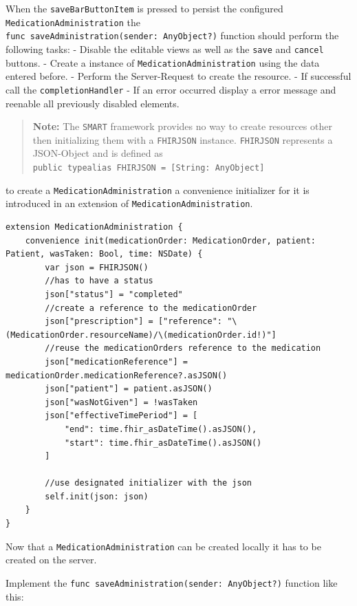 \documentclass{article}
\begin{document}
When the \texttt{saveBarButtonItem} is pressed to persist the configured
\texttt{MedicationAdministration} the
\texttt{func\ saveAdministration(sender:\ AnyObject?)} function should
perform the following tasks: - Disable the editable views as well as the
\texttt{save} and \texttt{cancel} buttons. - Create a instance of
\texttt{MedicationAdministration} using the data entered before. -
Perform the Server-Request to create the resource. - If successful call
the \texttt{completionHandler} - If an error occurred display a error
message and reenable all previously disabled elements.

\begin{quote}
\textbf{Note:} The \texttt{SMART} framework provides no way to create
resources other then initializing them with a \texttt{FHIRJSON}
instance. \texttt{FHIRJSON} represents a JSON-Object and is defined as
\texttt{public\ typealias\ FHIRJSON\ =\ {[}String:\ AnyObject{]}}
\end{quote}

to create a \texttt{MedicationAdministration} a convenience initializer
for it is introduced in an extension of
\texttt{MedicationAdministration}.

\begin{verbatim}
extension MedicationAdministration {
    convenience init(medicationOrder: MedicationOrder, patient: Patient, wasTaken: Bool, time: NSDate) {
        var json = FHIRJSON()
        //has to have a status
        json["status"] = "completed"
        //create a reference to the medicationOrder
        json["prescription"] = ["reference": "\(MedicationOrder.resourceName)/\(medicationOrder.id!)"]
        //reuse the medicationOrders reference to the medication
        json["medicationReference"] = medicationOrder.medicationReference?.asJSON()
        json["patient"] = patient.asJSON()
        json["wasNotGiven"] = !wasTaken
        json["effectiveTimePeriod"] = [
            "end": time.fhir_asDateTime().asJSON(),
            "start": time.fhir_asDateTime().asJSON()
        ]

        //use designated initializer with the json
        self.init(json: json)
    }
}
\end{verbatim}

Now that a \texttt{MedicationAdministration} can be created locally it
has to be created on the server.

Implement the \texttt{func\ saveAdministration(sender:\ AnyObject?)}
function like this:
\end{document}
